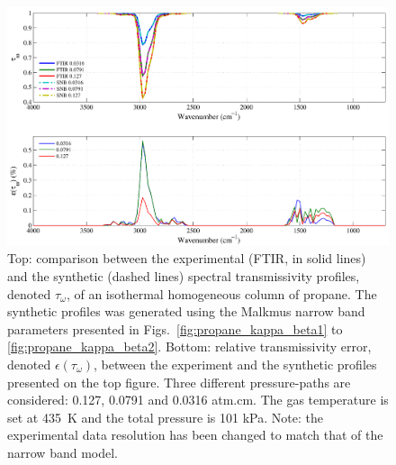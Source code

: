 \begin{figure}[p]
\includegraphics[width=\textwidth]{Figures/Comparison_Fit_Propane_MALKMUS_Temp435K.pdf}
\caption{Top: comparison between the experimental (FTIR, in solid lines) and the synthetic (dashed lines) spectral transmissivity profiles, denoted $\tau_{\omega}$, of an isothermal homogeneous column of propane. The synthetic profiles was generated using the Malkmus narrow band parameters presented in Figs.~\ref{fig:propane_kappa_beta1} to \ref{fig:propane_kappa_beta2}. Bottom: relative transmissivity error, denoted $\epsilon{(\tau_{\omega})}$, between the experiment and the synthetic profiles presented on the top figure. Three different pressure-paths are considered: 0.127, 0.0791 and 0.0316 atm.cm. The gas temperature is set at 435~K and the total pressure is 101 kPa. Note: the experimental data resolution has been changed to match that of the narrow band model. \label{fig:propane_SNBVerify_435K}}
\end{figure}

